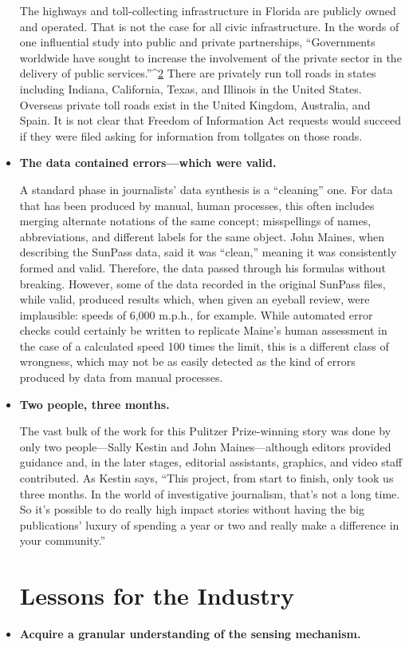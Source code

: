 \begin{itemize}
The highways and toll-collecting infrastructure in Florida are publicly
owned and operated. That is not the case for all civic infrastructure. In
the words of one influential study into public and private partnerships,
``Governments worldwide have sought to increase the involvement
of the private sector in the delivery of public services.''^{\href{#endnotes-sun-sentinel}{2}} There
are privately run toll roads in states including Indiana, California,
Texas, and Illinois in the United States. Overseas private toll roads
exist in the United Kingdom, Australia, and Spain. It is not clear that
Freedom of Information Act requests would succeed if they were filed
asking for information from tollgates on those roads.
\item \textbf{The data contained errors—which were valid.}

A standard phase in journalists' data synthesis is a ``cleaning'' one.
For data that has been produced by manual, human processes, this
often includes merging alternate notations of the same concept; misspellings
of names, abbreviations, and different labels for the same
object. John Maines, when describing the SunPass data, said it was
``clean,'' meaning it was consistently formed and valid. Therefore, the
data passed through his formulas without breaking. However, some
of the data recorded in the original SunPass files, while valid, produced
results which, when given an eyeball review, were implausible:
speeds of 6,000 m.p.h., for example. While automated error checks
could certainly be written to replicate Maine's human assessment in
the case of a calculated speed 100 times the limit, this is a different
class of wrongness, which may not be as easily detected as the kind of
errors produced by data from manual processes.
\item \textbf{Two people, three months.}

The vast bulk of the work for this Pulitzer Prize-winning story was done
by only two people—Sally Kestin and John Maines—although editors
provided guidance and, in the later stages, editorial assistants, graphics,
and video staff contributed. As Kestin says, ``This project, from
start to finish, only took us three months. In the world of investigative
journalism, that's not a long time. So it's possible to do really high
impact stories without having the big publications' luxury of spending
a year or two and really make a difference in your community.''

\section{Lessons for the Industry}
\item \textbf{Acquire a granular understanding of the sensing mechanism.}


\end{itemize}
